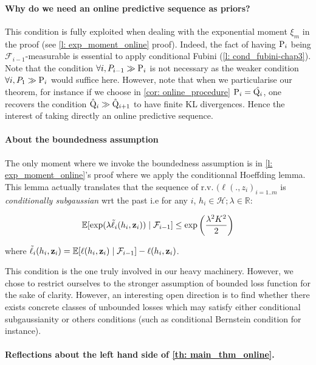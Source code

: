 \paragraph{Why do we need an online predictive sequence as priors? }

This condition is fully exploited when dealing with the exponential moment $\xi_m$ in the proof (see \cref{l: exp_moment_online} proof). Indeed, the fact of having $\P_{i}$ being $\mathcal{F}_{i-1}$-measurable is essential to apply conditional Fubini (\cref{l: cond_fubini-chap3}). Note that the condition $\forall i , P_{i-1}\gg \P_{i}$ is not necessary as the weaker condition $\forall i, P_1 \gg \P_{i}$ would suffice here.
However, note that when we particularise our theorem, for instance if we choose in \cref{cor: online_procedure} $\P_{i}= \hat{\Q_{i}}$, one recovers the condition $\hat{\Q}_{i}\gg\hat{\Q}_{i+1}$ to have finite KL divergences. Hence the interest of taking directly an online predictive sequence.

\paragraph{About the boundedness assumption}

The only moment where we invoke the boundedness assumption is in \cref{l: exp_moment_online}'s proof where we apply the conditionnal Hoeffding lemma. This lemma actually translates that the sequence of r.v. $(\ell(.,z_i)_{i=1..m}$ is \emph{conditionally subgaussian} wrt the past i.e for any $i$, $h_i\in\mathcal{H}; \lambda\in\mathbb{R}$:

\[ \mathbb{E}[\exp(\lambda \Tilde{\ell}_i(h_i,\z_i)) \mid \mathcal{F}_{i-1}] \leq \exp\left( \frac{\lambda^2K^2}{2}\right)\]

 where $\Tilde{\ell}_i(h_i,\z_i)= \mathbb{E}[\ell(h_i,\z_i)\mid \mathcal{F}_{i-1}]-  \ell(h_i,\z_i)$.

 This condition is the one truly involved in our heavy machinery. However, we chose to restrict ourselves to the stronger assumption of bounded loss function for the sake of clarity. However, an interesting open direction is to find whether there exists concrete classes of unbounded losses which may satisfy either conditional subgaussianity or others conditions (such as conditional Bernstein condition for instance).


 \paragraph{Reflections about the left hand side of \cref{th: main_thm_online}.}

